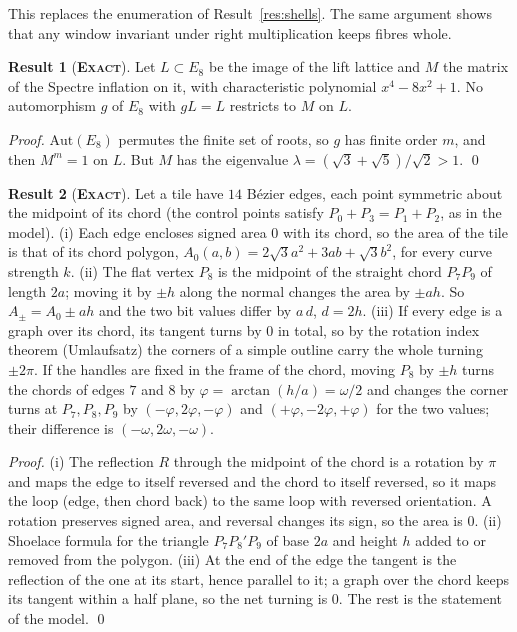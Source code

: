 \documentclass[11pt]{article}
\newcommand{\exact}{\textbf{\textsc{Exact}}}
\theoremstyle{definition}
\newtheorem{result}{Result}
\begin{document}
This replaces the enumeration of Result~\ref{res:shells}. The same argument shows that any window invariant under right multiplication keeps fibres whole.
\begin{result}[\exact]\label{res:found-inflation}
Let $L\subset E_8$ be the image of the lift lattice and $M$ the matrix of the Spectre inflation on it, with characteristic polynomial $x^4-8x^2+1$. No automorphism $g$ of $E_8$ with $gL=L$ restricts to $M$ on $L$.
\end{result}
\emph{Proof.} $\mathrm{Aut}(E_8)$ permutes the finite set of roots, so $g$ has finite order $m$, and then $M^m=1$ on $L$. But $M$ has the eigenvalue $\lambda=(\sqrt3+\sqrt5)/\sqrt2>1$. \qed
\begin{result}[\exact]\label{res:found-area}
Let a tile have $14$ Bézier edges, each point symmetric about the midpoint of its chord (the control points satisfy $P_0+P_3=P_1+P_2$, as in the model). (i) Each edge encloses signed area $0$ with its chord, so the area of the tile is that of its chord polygon, $A_0(a,b)=2\sqrt3a^2+3ab+\sqrt3b^2$, for every curve strength $k$. (ii) The flat vertex $P_8$ is the midpoint of the straight chord $P_7P_9$ of length $2a$; moving it by $\pm h$ along the normal changes the area by $\pm ah$. So $A_\pm=A_0\pm ah$ and the two bit values differ by $a\,d$, $d=2h$. (iii) If every edge is a graph over its chord, its tangent turns by $0$ in total, so by the rotation index theorem (Umlaufsatz) the corners of a simple outline carry the whole turning $\pm2\pi$. If the handles are fixed in the frame of the chord, moving $P_8$ by $\pm h$ turns the chords of edges $7$ and $8$ by $\varphi=\arctan(h/a)=\omega/2$ and changes the corner turns at $P_7,P_8,P_9$ by $(-\varphi,2\varphi,-\varphi)$ and $(+\varphi,-2\varphi,+\varphi)$ for the two values; their difference is $(-\omega,2\omega,-\omega)$.
\end{result}
\emph{Proof.} (i) The reflection $R$ through the midpoint of the chord is a rotation by $\pi$ and maps the edge to itself reversed and the chord to itself reversed, so it maps the loop (edge, then chord back) to the same loop with reversed orientation. A rotation preserves signed area, and reversal changes its sign, so the area is $0$. (ii) Shoelace formula for the triangle $P_7P_8'P_9$ of base $2a$ and height $h$ added to or removed from the polygon. (iii) At the end of the edge the tangent is the reflection of the one at its start, hence parallel to it; a graph over the chord keeps its tangent within a half plane, so the net turning is $0$. The rest is the statement of the model. \qed
\end{document}
